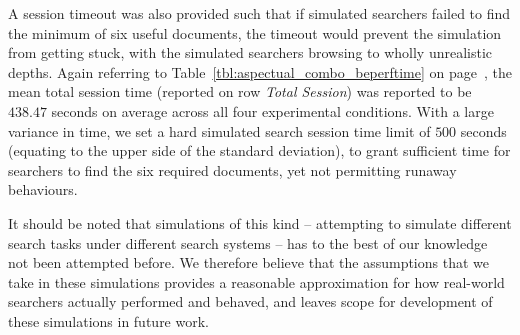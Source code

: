 A session timeout was also provided such that if simulated searchers failed to find the minimum of six useful documents, the timeout would prevent the simulation from getting stuck, with the simulated searchers browsing to wholly unrealistic depths. Again referring to Table~\ref{tbl:aspectual_combo_beperftime} on page~\pageref{tbl:aspectual_combo_beperftime}, the mean total session time (reported on row \emph{Total Session}) was reported to be $438.47$ seconds on average across all four experimental conditions. With a large variance in time, we set a hard simulated search session time limit of $500$ seconds (equating to the upper side of the standard deviation), to grant sufficient time for searchers to find the six required documents, yet not permitting runaway behaviours.

It should be noted that simulations of this kind -- attempting to simulate different search tasks under different search systems -- has to the best of our knowledge not been attempted before. We therefore believe that the assumptions that we take in these simulations provides a reasonable approximation for how real-world searchers actually performed and behaved, and leaves scope for development of these simulations in future work.

